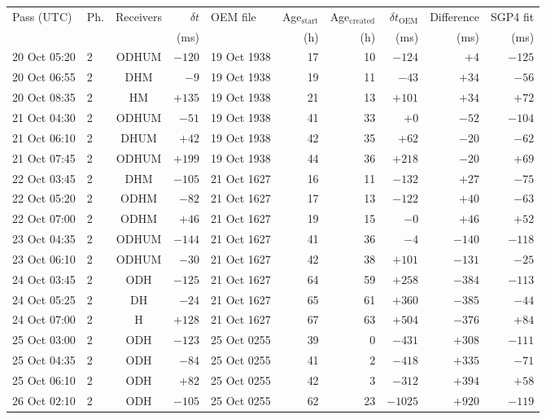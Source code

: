 \begin{tabular}{llcrlrrrrr}
\toprule
Pass (UTC) & Ph. & Receivers & $\delta t$ & OEM file & Age$_\mathrm{start}$ & Age$_\mathrm{created}$ & $\delta t_\mathrm{OEM}$ & Difference & SGP4 fit \\
 & & & (ms) & & (h) & (h) & (ms) & (ms) & (ms) \\
\midrule
20 Oct 05:20 & 2 & ODHUM & $-120$ & 19 Oct 1938 & 17 & 10 & $-124$ & $+4$ & $-125$ \\
20 Oct 06:55 & 2 & DHM & $-9$ & 19 Oct 1938 & 19 & 11 & $-43$ & $+34$ & $-56$ \\
20 Oct 08:35 & 2 & HM & $+135$ & 19 Oct 1938 & 21 & 13 & $+101$ & $+34$ & $+72$ \\
21 Oct 04:30 & 2 & ODHUM & $-51$ & 19 Oct 1938 & 41 & 33 & $+0$ & $-52$ & $-104$ \\
21 Oct 06:10 & 2 & DHUM & $+42$ & 19 Oct 1938 & 42 & 35 & $+62$ & $-20$ & $-62$ \\
21 Oct 07:45 & 2 & ODHUM & $+199$ & 19 Oct 1938 & 44 & 36 & $+218$ & $-20$ & $+69$ \\
22 Oct 03:45 & 2 & DHM & $-105$ & 21 Oct 1627 & 16 & 11 & $-132$ & $+27$ & $-75$ \\
22 Oct 05:20 & 2 & ODHM & $-82$ & 21 Oct 1627 & 17 & 13 & $-122$ & $+40$ & $-63$ \\
22 Oct 07:00 & 2 & ODHM & $+46$ & 21 Oct 1627 & 19 & 15 & $-0$ & $+46$ & $+52$ \\
23 Oct 04:35 & 2 & ODHUM & $-144$ & 21 Oct 1627 & 41 & 36 & $-4$ & $-140$ & $-118$ \\
23 Oct 06:10 & 2 & ODHUM & $-30$ & 21 Oct 1627 & 42 & 38 & $+101$ & $-131$ & $-25$ \\
24 Oct 03:45 & 2 & ODH & $-125$ & 21 Oct 1627 & 64 & 59 & $+258$ & $-384$ & $-113$ \\
24 Oct 05:25 & 2 & DH & $-24$ & 21 Oct 1627 & 65 & 61 & $+360$ & $-385$ & $-44$ \\
24 Oct 07:00 & 2 & H & $+128$ & 21 Oct 1627 & 67 & 63 & $+504$ & $-376$ & $+84$ \\
25 Oct 03:00 & 2 & ODH & $-123$ & 25 Oct 0255 & 39 & 0 & $-431$ & $+308$ & $-111$ \\
25 Oct 04:35 & 2 & ODH & $-84$ & 25 Oct 0255 & 41 & 2 & $-418$ & $+335$ & $-71$ \\
25 Oct 06:10 & 2 & ODH & $+82$ & 25 Oct 0255 & 42 & 3 & $-312$ & $+394$ & $+58$ \\
26 Oct 02:10 & 2 & ODH & $-105$ & 25 Oct 0255 & 62 & 23 & $-1025$ & $+920$ & $-119$ \\

\end{tabular}
